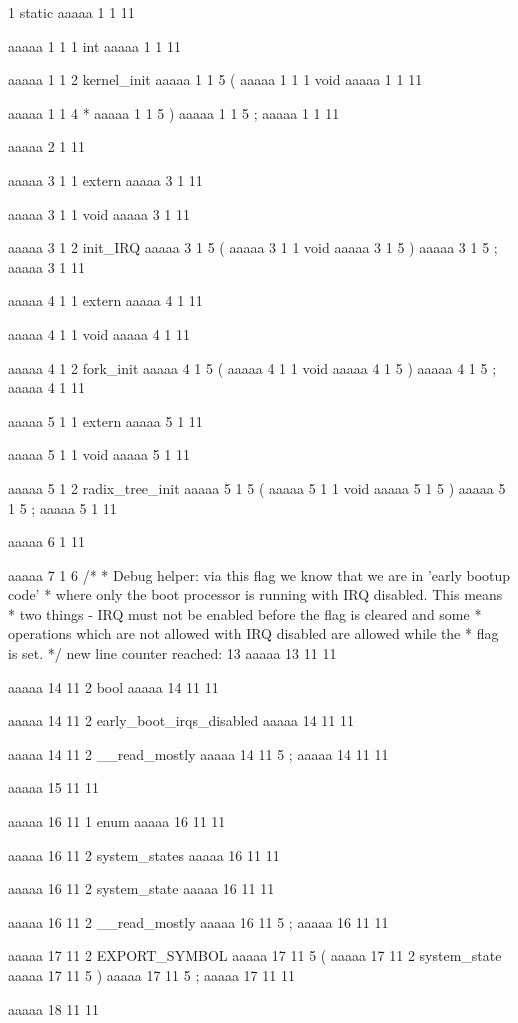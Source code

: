 1
static
aaaaa 1 1
11
 
aaaaa 1 1
1
int
aaaaa 1 1
11
 
aaaaa 1 1
2
kernel_init
aaaaa 1 1
5
(
aaaaa 1 1
1
void
aaaaa 1 1
11
 
aaaaa 1 1
4
*
aaaaa 1 1
5
)
aaaaa 1 1
5
;
aaaaa 1 1
11


aaaaa 2 1
11


aaaaa 3 1
1
extern
aaaaa 3 1
11
 
aaaaa 3 1
1
void
aaaaa 3 1
11
 
aaaaa 3 1
2
init_IRQ
aaaaa 3 1
5
(
aaaaa 3 1
1
void
aaaaa 3 1
5
)
aaaaa 3 1
5
;
aaaaa 3 1
11


aaaaa 4 1
1
extern
aaaaa 4 1
11
 
aaaaa 4 1
1
void
aaaaa 4 1
11
 
aaaaa 4 1
2
fork_init
aaaaa 4 1
5
(
aaaaa 4 1
1
void
aaaaa 4 1
5
)
aaaaa 4 1
5
;
aaaaa 4 1
11


aaaaa 5 1
1
extern
aaaaa 5 1
11
 
aaaaa 5 1
1
void
aaaaa 5 1
11
 
aaaaa 5 1
2
radix_tree_init
aaaaa 5 1
5
(
aaaaa 5 1
1
void
aaaaa 5 1
5
)
aaaaa 5 1
5
;
aaaaa 5 1
11


aaaaa 6 1
11


aaaaa 7 1
6
/*
 * Debug helper: via this flag we know that we are in 'early bootup code'
 * where only the boot processor is running with IRQ disabled.  This means
 * two things - IRQ must not be enabled before the flag is cleared and some
 * operations which are not allowed with IRQ disabled are allowed while the
 * flag is set.
 */
new line counter reached: 13
aaaaa 13 11
11


aaaaa 14 11
2
bool
aaaaa 14 11
11
 
aaaaa 14 11
2
early_boot_irqs_disabled
aaaaa 14 11
11
 
aaaaa 14 11
2
__read_mostly
aaaaa 14 11
5
;
aaaaa 14 11
11


aaaaa 15 11
11


aaaaa 16 11
1
enum
aaaaa 16 11
11
 
aaaaa 16 11
2
system_states
aaaaa 16 11
11
 
aaaaa 16 11
2
system_state
aaaaa 16 11
11
 
aaaaa 16 11
2
__read_mostly
aaaaa 16 11
5
;
aaaaa 16 11
11


aaaaa 17 11
2
EXPORT_SYMBOL
aaaaa 17 11
5
(
aaaaa 17 11
2
system_state
aaaaa 17 11
5
)
aaaaa 17 11
5
;
aaaaa 17 11
11


aaaaa 18 11
11


